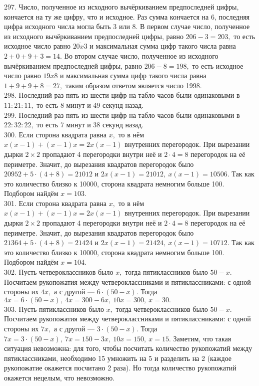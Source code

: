 297. Число, полученное из исходного вычёркиванием предпоследней цифры, кончается на ту же цифру, что и исходное. Раз сумма кончается на 6, последняя цифра исходного числа могла быть 3 или 8. В первом случае число, полученное из исходного вычёркиванием предпоследней цифры, равно $206-3=203,$ то есть исходное число равно $\overline{20x3}$ и максимальная сумма цифр такого числа равна $2+0+9+3=14.$ Во втором случае число, полученное из исходного вычёркиванием предпоследней цифры, равно $206-8=198,$ то есть исходное число равно $\overline{19x8}$ и максимальная сумма цифр такого числа равна $1+9+9+8=27,$ таким образом ответом является число 1998.\\
298. Последний раз пять из шести цифр на табло часов были одинаковыми в $11:21:11,$ то есть 8 минут и 49 секунд назад.\\
299. Последний раз пять из шести цифр на табло часов были одинаковыми в $22:32:22,$ то есть 7 минут и 38 секунд назад.\\
300. Если сторона квадрата равна $x,$ то в нём $x(x-1)+(x-1)x=2x(x-1)$ внутренних перегородок. При вырезании дырки $2\times2$ пропадают 4 перегородки внутри неё и $2\cdot4=8$ перегородок на её периметре. Значит, до вырезания квадратов перегородок было $20952+5\cdot(4+8)=21012$ и $2x(x-1)=21012,\ x(x-1)=10506.$ Так как это количество близко к 10000, сторона квадрата немногим больше 100. Подбором найдём $x=103.$\\
301. Если сторона квадрата равна $x,$ то в нём $x(x-1)+(x-1)x=2x(x-1)$ внутренних перегородок. При вырезании дырки $2\times2$ пропадают 4 перегородки внутри неё и $2\cdot4=8$ перегородок на её периметре. Значит, до вырезания квадратов перегородок было $21364+5\cdot(4+8)=21424$ и $2x(x-1)=21424,\ x(x-1)=10712.$ Так как это количество близко к 10000, сторона квадрата немногим больше 100. Подбором найдём $x=104.$\\
302. Пусть четвероклассников было $x,$ тогда пятиклассников было  $50-x.$ Посчитаем рукопожатия между четвероклассниками и пятиклассниками: с одной стороны их $4x,$ а с другой --- $6\cdot(50-x).$ Тогда $4x=6\cdot(50-x),\
4x=300-6x,\ 10x=300,\ x=30.$\\
303. Пусть пятиклассников было $x,$ тогда четвероклассников было  $50-x.$ Посчитаем рукопожатия между четвероклассниками и пятиклассниками: с одной стороны их $7x,$ а с другой --- $3\cdot(50-x).$ Тогда $7x=3\cdot(50-x),\
7x=150-3x,\ 10x=150,\ x=15.$ Заметим, что такая ситуация невозможна: для того, чтобы посчитать количество рукопожатий между пятиклассниками, необходимо 15 умножить на 5 и разделить на 2 (каждое рукопожатие окажется посчитано 2 раза). Но тогда количество рукопожатий окажется нецелым, что невозможно.\\
